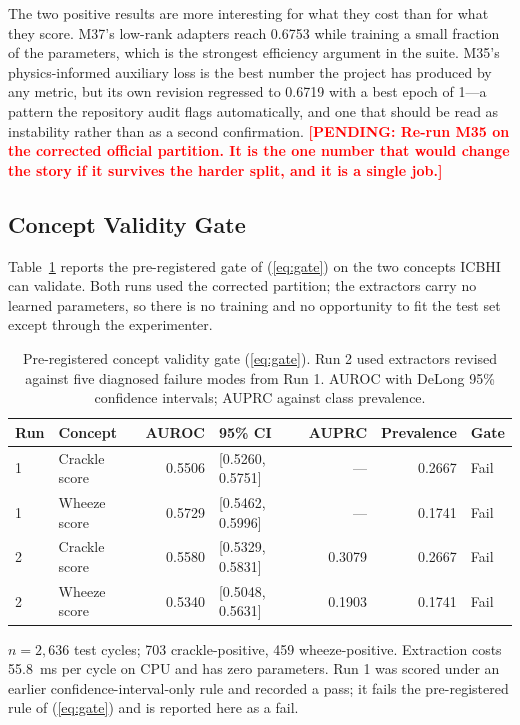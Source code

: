 \documentclass[journal,onecolumn]{IEEEtran}
\newcommand{\pending}[1]{\textcolor{red}{\textbf{[PENDING: #1]}}}
\begin{document}
The two positive results are more interesting for what they cost than for what they
score. M37's low-rank adapters reach 0.6753 while training a small fraction of the
parameters, which is the strongest efficiency argument in the suite. M35's
physics-informed auxiliary loss is the best number the project has produced by any
metric, but its own revision regressed to 0.6719 with a best epoch of 1---a pattern
the repository audit flags automatically, and one that should be read as instability
rather than as a second confirmation. \pending{Re-run M35 on the corrected official
partition. It is the one number that would change the story if it survives the harder
split, and it is a single job.}

\subsection{Concept Validity Gate}
\label{subsec:conceptgate}

Table~\ref{tab:gate} reports the pre-registered gate of (\ref{eq:gate}) on the two
concepts ICBHI can validate. Both runs used the corrected partition; the extractors
carry no learned parameters, so there is no training and no opportunity to fit the
test set except through the experimenter.

\begin{table}[!t]
\centering
\caption{Pre-registered concept validity gate (\ref{eq:gate}). Run 2 used extractors
revised against five diagnosed failure modes from Run 1. AUROC with DeLong 95\%
confidence intervals; AUPRC against class prevalence.}
\label{tab:gate}
\begin{tabular}{llrlrrl}
\toprule
Run & Concept & AUROC & 95\% CI & AUPRC & Prevalence & Gate \\
\midrule
1 & Crackle score & 0.5506 & [0.5260, 0.5751] & --- & 0.2667 & Fail \\
1 & Wheeze score  & 0.5729 & [0.5462, 0.5996] & --- & 0.1741 & Fail \\
2 & Crackle score & 0.5580 & [0.5329, 0.5831] & 0.3079 & 0.2667 & Fail \\
2 & Wheeze score  & 0.5340 & [0.5048, 0.5631] & 0.1903 & 0.1741 & Fail \\
\bottomrule
\end{tabular}

\vspace{2pt}
\footnotesize $n = 2{,}636$ test cycles; 703 crackle-positive, 459 wheeze-positive.
Extraction costs 55.8~ms per cycle on CPU and has zero parameters. Run 1 was scored
under an earlier confidence-interval-only rule and recorded a pass; it fails the
pre-registered rule of (\ref{eq:gate}) and is reported here as a fail.
\end{table}
\end{document}
